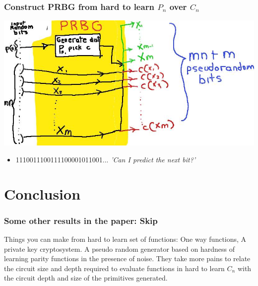 \documentclass{beamer}
\begin{document}
\begin{frame}
\frametitle{Construct PRBG from hard to learn $P_{n}$ over $C_{n}$}
\includegraphics[scale=0.3]{images/prbg.jpg}
\begin{itemize}
\pitem Proof by contradiction: If you could break this PRBG, $C_{n}$ not hard to learn wrt $(P_{n}, U(\set{0, 1}^{n})$.
\item 1110011100111100001011001... \textit{'Can I predict the next bit?'}
\end{itemize}
\end{frame}


\section{Conclusion}
\begin{frame}
\frametitle{Some other results in the paper: Skip}
\begin{itemize}
\pitem Things you can make from hard to learn set of functions:
One way functions, A private key cryptosystem.
\pitem A pseudo random generator based on hardness of learning parity functions in the presence of noise.
\pitem They take more pains to relate the circuit size and depth required to evaluate functions in hard to learn $C_{n}$ with the circuit depth and size of the primitives generated.
\end{itemize}
\end{frame}
\end{document}
